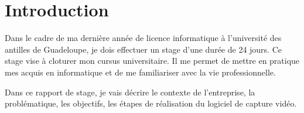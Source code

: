 \chapter{Introduction}
    Dans le cadre de ma dernière année de licence informatique à l'université des antilles de Guadeloupe, je dois effectuer un stage d'une durée de 24 jours. Ce stage vise à cloturer mon cursus universitaire.
    Il me permet de mettre en pratique mes acquis en informatique et de me familiariser avec la vie professionnelle.

    \vspace{0.5cm}

    Dans ce rapport de stage, je vais décrire le contexte de l'entreprise, la problématique, les objectifs, les étapes de réalisation du logiciel de capture vidéo.